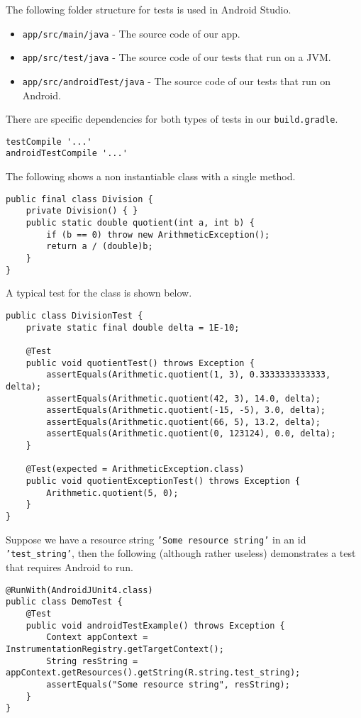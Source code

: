 \noindent The following folder structure for tests is used in Android Studio.
\begin{itemize}
\item \texttt{app/src/main/java} - The source code of our app.
\item \texttt{app/src/test/java} - The source code of our tests that run on a JVM.
\item \texttt{app/src/androidTest/java} - The source code of our tests that run on Android.
\end{itemize}
There are specific dependencies for both types of tests in our \texttt{build.gradle}.
\begin{lstlisting}[style=A_txt]
testCompile '...'
androidTestCompile '...'
\end{lstlisting}
The following shows a non instantiable class with a single method.
\begin{lstlisting}[style=A_Java]
public final class Division {
    private Division() { }
    public static double quotient(int a, int b) {
        if (b == 0) throw new ArithmeticException();
        return a / (double)b;
    }
}
\end{lstlisting}
A typical test for the class is shown below.
\begin{lstlisting}[style=A_Java]
public class DivisionTest {
    private static final double delta = 1E-10;

    @Test
    public void quotientTest() throws Exception {
        assertEquals(Arithmetic.quotient(1, 3), 0.3333333333333, delta);
        assertEquals(Arithmetic.quotient(42, 3), 14.0, delta);
        assertEquals(Arithmetic.quotient(-15, -5), 3.0, delta);
        assertEquals(Arithmetic.quotient(66, 5), 13.2, delta);
        assertEquals(Arithmetic.quotient(0, 123124), 0.0, delta);
    }

    @Test(expected = ArithmeticException.class)
    public void quotientExceptionTest() throws Exception {
        Arithmetic.quotient(5, 0);
    }
}
\end{lstlisting}
Suppose we have a resource string \texttt{'Some resource string'} in an id \texttt{'test\_string'}, then the following (although rather useless) demonstrates a test that requires Android to run.
\begin{lstlisting}[style=A_Java]
@RunWith(AndroidJUnit4.class)
public class DemoTest {
    @Test
    public void androidTestExample() throws Exception {
        Context appContext = InstrumentationRegistry.getTargetContext();
        String resString = appContext.getResources().getString(R.string.test_string);
        assertEquals("Some resource string", resString);
    }
}
\end{lstlisting}

